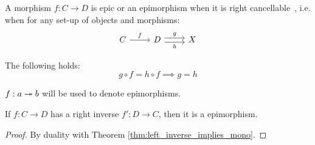 \begin{definition}[Epimorphism]
  A morphism $f:C\to D$ is epic or an epimorphism when it is right
  cancellable~\parencite[p.~19]{lane:working_mathematician}, i.e. when for any
  set-up of objects and morphisms:
  \[\begin{tikzcd}[ampersand replacement=\&]
    C \& D \& X
    \arrow["h"', shift right=1, from=1-2, to=1-3]
    \arrow["f", from=1-1, to=1-2]
    \arrow["g", shift left=1, from=1-2, to=1-3]
  \end{tikzcd}\]

  The following holds:
  \[g \circ f = h \circ f \implies g = h\]
\end{definition}

\begin{remark}
  $f:a\twoheadrightarrow b$ will be used to denote epimorphisms.
\end{remark}

\begin{theorem}\label{thm:right_inverse_implies_epi}
  If $f:C\to D$ has a right inverse $f':D\to C$, then it is a epimorphism.

  \begin{proof}
    By duality with Theorem \ref{thm:left_inverse_implies_mono}.
  \end{proof}
\end{theorem}
